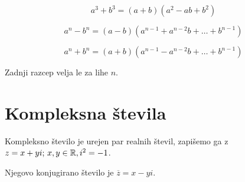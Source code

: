 \[
	a^3 + b^3 = (a+b)(a^2-ab+b^2)
\]

\[
	a^n - b^n = (a-b)(a^{n-1} + a^{n-2}b + \ldots + b^{n-1})
\]

\[
	a^n + b^n = (a+b)(a^{n-1} - a^{n-2}b + \ldots + b^{n-1})
\]

Zadnji razcep velja le za lihe $n$.

\section{Kompleksna števila}


Kompleksno število je urejen par realnih števil, zapišemo ga z $z = x+yi;\, x,y \in \mathbb{R}, i^2 = -1$.

Njegovo konjugirano število je $\overline{z} = x - yi$.